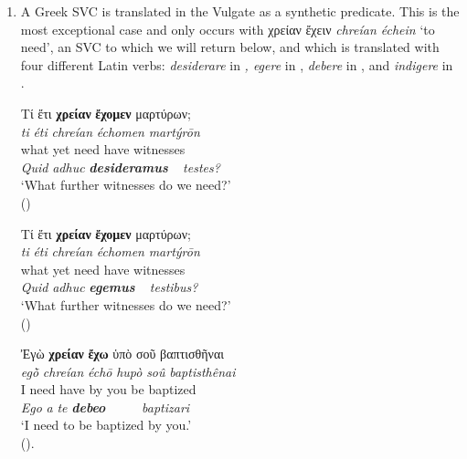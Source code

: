 \documentclass[output=paper,colorlinks,citecolor=brown]{langscibook}
\begin{document}
\begin{enumerate}
\renewcommand{\labelenumi}{(\roman{enumi})}

\item A Greek SVC is translated in the Vulgate as a synthetic predicate. This is the most
  exceptional case and only occurs with χρείαν ἔχειν \emph{chreían échein} `to need', an
  SVC to which we will return below, and which is translated with four different Latin
  verbs: \emph{desiderare} in \emph{, egere} in , \emph{debere} in , and
  \emph{indigere} in .


\ea\label{ex:bj:15}

\ea\label{ex:bj:15a}

\gllll Τί ἔτι \textbf{χρείαν} \textbf{ἔχομεν} μαρτύρων;\\
 \textit{ti} \textit{éti} \textit{chreían} \textit{échomen} \textit{martýrōn}\\
what yet need have witnesses\\
\emph{Quid} \emph{adhuc} \textbf{\itshape desideramus} ~ \emph{testes?}\\
\glt `What further witnesses do we need?' \\
\hspace*{\fill}()

\ex\label{ex:bj:15b}

\gllll Τί ἔτι \textbf{χρείαν} \textbf{ἔχομεν} μαρτύρων;\\
 \textit{ti} \textit{éti} \textit{chreían} \textit{échomen} \textit{martýrōn}\\
what yet need have witnesses\\
\emph{Quid} \emph{adhuc} \textbf{\itshape egemus} ~ \emph{testibus?}\\
\glt `What further witnesses do we need?' \\
\hspace*{\fill}()

\ex\label{ex:bj:15c}

\gllll Ἐγὼ \textbf{χρείαν} \textbf{ἔχω} ὑπὸ σοῦ βαπτισθῆναι\\
 \textit{egṑ} \textit{chreían} \textit{échō} \textit{hupò} \textit{soû} \textit{baptisthênai}\\
I need have by you {be baptized}\\
\emph{Ego} {\emph{a} \emph{te} \textbf{\itshape debeo}} ~ ~ ~ \emph{baptizari}\\
\glt `I need to be baptized by you.' \\
\hspace*{\fill}().


\end{enumerate}
\end{document}
